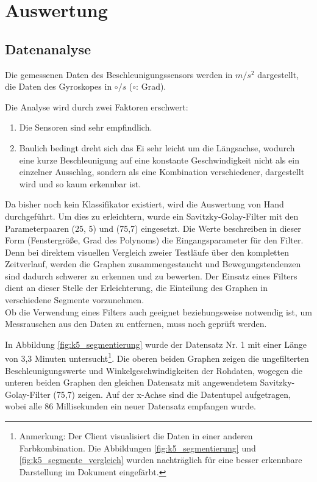 \section{Auswertung}

\subsection{Datenanalyse}
Die gemessenen Daten des Beschleunigungssensors werden in $m/s^{2}$ 
dargestellt, die Daten des Gyroskopes in $\circ/s$ ($\circ$:  Grad).

Die Analyse wird durch zwei Faktoren erschwert:
\begin{enumerate}
	\item Die Sensoren sind sehr empfindlich.
	\item Baulich bedingt dreht sich das Ei sehr leicht um die Längsachse, wodurch eine kurze Beschleunigung auf eine konstante Geschwindigkeit nicht als ein einzelner Ausschlag, sondern als eine Kombination verschiedener, dargestellt wird und so kaum erkennbar ist.
\end{enumerate}

Da bisher noch kein Klassifikator existiert, wird die Auswertung von Hand durchgeführt. Um dies zu erleichtern, wurde ein Savitzky-Golay-Filter mit den Parameterpaaren (25, 5) und (75,7) eingesetzt. Die Werte beschreiben in dieser Form (Fenstergröße, Grad des Polynoms) die Eingangsparameter für den Filter. Denn bei direktem visuellen Vergleich zweier Testläufe über den kompletten Zeitverlauf, werden die Graphen zusammengestaucht und Bewegungstendenzen sind dadurch schwerer zu erkennen und zu bewerten. Der Einsatz eines Filters dient an dieser Stelle der Erleichterung, die Einteilung des Graphen in verschiedene Segmente vorzunehmen. \\
Ob die Verwendung eines Filters auch geeignet beziehungsweise notwendig ist, um Messrauschen aus den Daten zu entfernen, muss noch geprüft werden.

In Abbildung \ref{fig:k5_segmentierung} wurde der Datensatz Nr. 1 mit einer Länge von 3,3 Minuten untersucht\footnote{Anmerkung: Der Client visualisiert die Daten in einer anderen Farbkombination. Die Abbildungen \ref{fig:k5_segmentierung} und \ref{fig:k5_segmente_vergleich} wurden nachträglich für eine besser erkennbare Darstellung im Dokument eingefärbt.}. Die oberen beiden Graphen zeigen die ungefilterten Beschleunigungswerte und Winkelgeschwindigkeiten der Rohdaten, wogegen die unteren beiden Graphen den gleichen Datensatz mit angewendetem Savitzky-Golay-Filter (75,7) zeigen. Auf der x-Achse sind die Datentupel aufgetragen, wobei alle 86 Millisekunden ein neuer Datensatz empfangen wurde.

